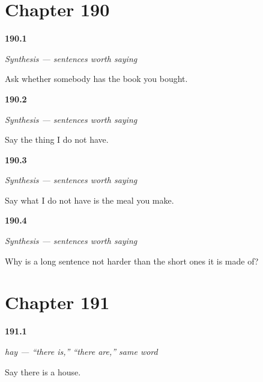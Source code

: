\section*{Chapter 190}

\noindent\begin{minipage}[t]{\linewidth}
\raggedright
\hypertarget{review-ES-C53-sintesis-frases-largas-ask}{\textbf{190.1}} \emph{Synthesis — sentences worth saying}\par
\small Ask whether somebody has the book you bought.
\end{minipage}\par\medskip

\noindent\begin{minipage}[t]{\linewidth}
\raggedright
\hypertarget{review-ES-C53-sintesis-frases-largas-hole}{\textbf{190.2}} \emph{Synthesis — sentences worth saying}\par
\small Say the thing I do not have.
\end{minipage}\par\medskip

\noindent\begin{minipage}[t]{\linewidth}
\raggedright
\hypertarget{review-ES-C53-sintesis-frases-largas-full}{\textbf{190.3}} \emph{Synthesis — sentences worth saying}\par
\small Say what I do not have is the meal you make.
\end{minipage}\par\medskip

\noindent\begin{minipage}[t]{\linewidth}
\raggedright
\hypertarget{review-ES-C53-sintesis-frases-largas-why}{\textbf{190.4}} \emph{Synthesis — sentences worth saying}\par
\small Why is a long sentence not harder than the short ones it is made of?
\end{minipage}\par\medskip

\section*{Chapter 191}

\noindent\begin{minipage}[t]{\linewidth}
\raggedright
\hypertarget{review-ES-C54-hay-one}{\textbf{191.1}} \emph{hay — \textquotedblleft{}there is,\textquotedblright{} \textquotedblleft{}there are,\textquotedblright{} same word}\par
\small Say there is a house.
\end{minipage}\par\medskip

